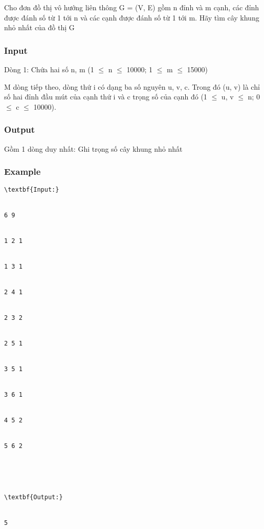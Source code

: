 



   Cho đơn đồ thị vô hướng liên thông G = (V, E) gồm n đỉnh và m cạnh, các đỉnh được đánh số từ 1 tới n và các cạnh được đánh số từ 1 tới m. Hãy tìm cây khung nhỏ nhất của đồ thị G  

\subsubsection{   Input  }

   Dòng 1: Chứa hai số n, m (1  $\le$  n  $\le$  10000; 1  $\le$  m  $\le$  15000)  

   M dòng tiếp theo, dòng thứ i có dạng ba số nguyên u, v, c. Trong đó (u, v) là chỉ số hai đỉnh đầu mút của cạnh thứ i và c trọng số của cạnh đó (1  $\le$  u, v  $\le$  n; 0  $\le$  c  $\le$  10000).  

\subsubsection{   Output  }

   Gồm 1 dòng duy nhất: Ghi trọng số cây khung nhỏ nhất  

\subsubsection{   Example  }
\begin{verbatim}
\textbf{Input:}


6 9


1 2 1


1 3 1


2 4 1


2 3 2


2 5 1


3 5 1


3 6 1


4 5 2


5 6 2





\textbf{Output:}


5


\end{verbatim}
